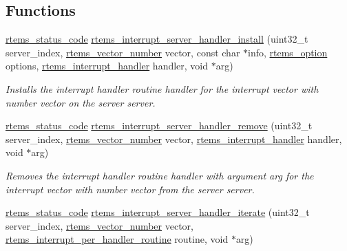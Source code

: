 \subsection*{Functions}
\begin{DoxyCompactItemize}
\item 
\mbox{\hyperlink{group__ClassicStatus_ga545d41846817eaba6143d52ee4d9e9fe}{rtems\+\_\+status\+\_\+code}} \mbox{\hyperlink{group__rtems__interrupt__extension_ga591084dbfb85313364d6591fef1768bc}{rtems\+\_\+interrupt\+\_\+server\+\_\+handler\+\_\+install}} (uint32\+\_\+t server\+\_\+index, \mbox{\hyperlink{group__ClassicINTR_ga3e434c197d99f128e78cae4d9358bd8b}{rtems\+\_\+vector\+\_\+number}} vector, const char $\ast$info, \mbox{\hyperlink{group__ClassicOptions_gad26685eb0e60a9650082935c31920e29}{rtems\+\_\+option}} options, \mbox{\hyperlink{group__rtems__interrupt__extension_gab39bd096ab2c3b41d03dace0e9777b08}{rtems\+\_\+interrupt\+\_\+handler}} handler, void $\ast$arg)
\begin{DoxyCompactList}\small\item\em Installs the interrupt handler routine {\itshape handler} for the interrupt vector with number {\itshape vector} on the server {\itshape server}. \end{DoxyCompactList}\item 
\mbox{\hyperlink{group__ClassicStatus_ga545d41846817eaba6143d52ee4d9e9fe}{rtems\+\_\+status\+\_\+code}} \mbox{\hyperlink{group__rtems__interrupt__extension_gad7840f288b1572dbcbe871b380e4eca7}{rtems\+\_\+interrupt\+\_\+server\+\_\+handler\+\_\+remove}} (uint32\+\_\+t server\+\_\+index, \mbox{\hyperlink{group__ClassicINTR_ga3e434c197d99f128e78cae4d9358bd8b}{rtems\+\_\+vector\+\_\+number}} vector, \mbox{\hyperlink{group__rtems__interrupt__extension_gab39bd096ab2c3b41d03dace0e9777b08}{rtems\+\_\+interrupt\+\_\+handler}} handler, void $\ast$arg)
\begin{DoxyCompactList}\small\item\em Removes the interrupt handler routine {\itshape handler} with argument {\itshape arg} for the interrupt vector with number {\itshape vector} from the server {\itshape server}. \end{DoxyCompactList}\item 
\mbox{\hyperlink{group__ClassicStatus_ga545d41846817eaba6143d52ee4d9e9fe}{rtems\+\_\+status\+\_\+code}} \mbox{\hyperlink{group__rtems__interrupt__extension_ga0a4f6995bde02b055963ae8d399c33d7}{rtems\+\_\+interrupt\+\_\+server\+\_\+handler\+\_\+iterate}} (uint32\+\_\+t server\+\_\+index, \mbox{\hyperlink{group__ClassicINTR_ga3e434c197d99f128e78cae4d9358bd8b}{rtems\+\_\+vector\+\_\+number}} vector, \mbox{\hyperlink{group__rtems__interrupt__extension_gad3e88a9acfac97a5021ff98471f5cd71}{rtems\+\_\+interrupt\+\_\+per\+\_\+handler\+\_\+routine}} routine, void $\ast$arg)

\end{DoxyCompactItemize}
